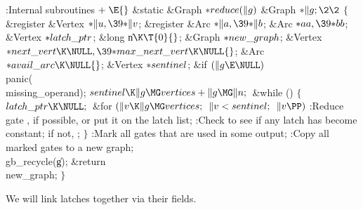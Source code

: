 \Y\B\4:Internal subroutines\X${}\mathrel+\E{}$\6
\1\1\&{static} \&{Graph} ${}{*}\\{reduce}(\|g){}$\6
\&{Graph} ${}{*}\|g;\2\2{}$\6
${}\{{}$\5
\1\&{register} \&{Vertex} ${}{*}\|u,\39{*}\|v{}$;\6
\&{register} \&{Arc} ${}{*}\|a,\39{*}\|b{}$;\6
\&{Arc} ${}{*}\\{aa},\39{*}\\{bb}{}$;\6
\&{Vertex} ${}{*}\\{latch\_ptr}{}$;\6
\&{long} \|n${}\K\T{0}{}$;\6
\&{Graph} ${}{*}\\{new\_graph}{}$;\6
\&{Vertex} ${}{*}\\{next\_vert}\K\NULL,\39{*}\\{max\_next\_vert}\K\NULL{}$;\6
\&{Arc} ${}{*}\\{avail\_arc}\K\NULL{}$;\6
\&{Vertex} ${}{*}\\{sentinel}{}$;\7
\&{if} ${}(\|g\E\NULL){}$\1\5
\\{panic}(\\{missing\_operand});\2\6
${}\\{sentinel}\K\|g\MG\\{vertices}+\|g\MG\|n;{}$\6
\&{while} ()\5
${}\{{}$\1\6
${}\\{latch\_ptr}\K\NULL;{}$\6
\&{for} ${}(\|v\K\|g\MG\\{vertices};{}$ ${}\|v<\\{sentinel};{}$ ${}\|v\PP){}$\1%
\5
:Reduce gate , if possible, or put it on the latch list\X;\2\6
:Check to see if any latch has become constant; if not, \X;\6
\4${}\}{}$\2\6
:Mark all gates that are used in some output\X;\6
:Copy all marked gates to a new graph\X;\6
\\{gb\_recycle}(\|g);\6
\&{return} \\{new\_graph};\6
\4${}\}{}$\2\par
\fi

We will link latches together via their  fields.

